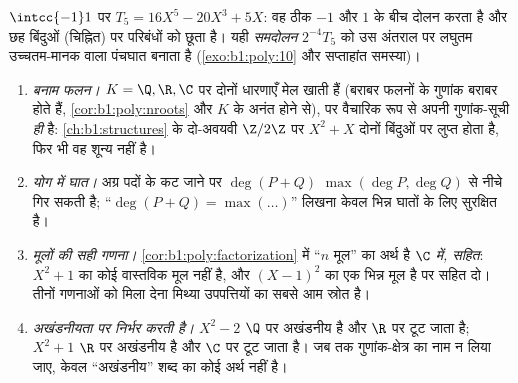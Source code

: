 \begin{omfigure}

{\small $\intcc{-1}1$ पर  $T_5 = 16X^5 - 20X^3 + 5X$: वह ठीक
$-1$ और $1$ के बीच दोलन करता है और छह बिंदुओं (चिह्नित) पर परिबंधों को छूता
है। यही \emph{समदोलन} $2^{-4}T_5$ को उस अंतराल पर लघुतम उच्चतम-मानक वाला
 पंचघात बनाता है (\cref{exo:b1:poly:10} और सप्ताहांत समस्या)।}
\end{omfigure}

\begin{remark}[बहुपदों की सामान्य भूलें]\label{rem:b1:poly:pitfalls}
\begin{enumerate}
  \item \emph{ बनाम फलन।} $K = \Q, \R, \C$ पर दोनों धारणाएँ मेल खाती
  हैं (बराबर फलनों के गुणांक बराबर होते हैं, \cref{cor:b1:poly:nroots} और
  $K$ के अनंत होने से), पर वैचारिक रूप से  अपनी गुणांक-सूची \emph{ही}
  है: \cref{ch:b1:structures} के दो-अवयवी  $\Z/2\Z$ पर $X^2 + X$
  दोनों बिंदुओं पर लुप्त होता है, फिर भी वह शून्य  नहीं है।
  \item \emph{योग में घात।} अग्र पदों के कट जाने पर $\deg(P + Q)$ $\max(\deg
  P, \deg Q)$ से नीचे गिर सकती है; ``$\deg(P + Q) = \max(\dots)$'' लिखना
  केवल भिन्न घातों के लिए सुरक्षित है।
  \item \emph{मूलों की सही गणना।} \cref{cor:b1:poly:factorization} में ``$n$
  मूल'' का अर्थ है \emph{$\C$ में,  सहित}: $X^2 + 1$ का कोई वास्तविक
  मूल नहीं है, और $(X-1)^2$ का एक भिन्न मूल है पर  सहित दो। तीनों
  गणनाओं को मिला देना मिथ्या उपपत्तियों का सबसे आम स्रोत है।
  \item \emph{अखंडनीयता  पर निर्भर करती है।} $X^2 - 2$ $\Q$ पर
  अखंडनीय है और $\R$ पर टूट जाता है; $X^2 + 1$ $\R$ पर अखंडनीय है और $\C$ पर
  टूट जाता है। जब तक गुणांक-क्षेत्र का नाम न लिया जाए, केवल ``अखंडनीय'' शब्द
  का कोई अर्थ नहीं है।
\end{enumerate}
\end{remark}

